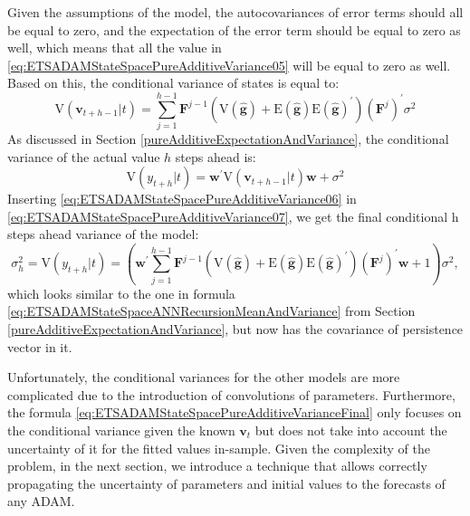 \documentclass[]{book}
\theoremstyle{definition}
\theoremstyle{definition}
\theoremstyle{definition}
\theoremstyle{definition}
\theoremstyle{remark}
\begin{document}
Given the assumptions of the model, the autocovariances of error terms should all be equal to zero, and the expectation of the error term should be equal to zero as well, which means that all the value in \eqref{eq:ETSADAMStateSpacePureAdditiveVariance05} will be equal to zero as well. Based on this, the conditional variance of states is equal to:
\begin{equation}
    \mathrm{V}(\mathbf{v}_{t+h-1}|t) = \sum_{j=1}^{h-1} \mathbf{F}^{j-1} \left( \mathrm{V} (\hat{\mathbf{g}}) + \mathrm{E} (\hat{\mathbf{g}}) \mathrm{E} (\hat{\mathbf{g}})^\prime \right) (\mathbf{F}^{j})^\prime \sigma^2
  \label{eq:ETSADAMStateSpacePureAdditiveVariance06}
\end{equation}
As discussed in Section \ref{pureAdditiveExpectationAndVariance}, the conditional variance of the actual value \(h\) steps ahead is:
\begin{equation}
    \mathrm{V}(y_{t+h}|t) = \mathbf{w}^\prime \mathrm{V}(\mathbf{v}_{t+h-1}|t) \mathbf{w} + \sigma^2
  \label{eq:ETSADAMStateSpacePureAdditiveVariance07}
\end{equation}
Inserting \eqref{eq:ETSADAMStateSpacePureAdditiveVariance06} in \eqref{eq:ETSADAMStateSpacePureAdditiveVariance07}, we get the final conditional h steps ahead variance of the model:
\begin{equation}
    \sigma^2_h = \mathrm{V}(y_{t+h}|t) = \left(\mathbf{w}^\prime \sum_{j=1}^{h-1} \mathbf{F}^{j-1} \left( \mathrm{V} (\hat{\mathbf{g}}) + \mathrm{E} (\hat{\mathbf{g}}) \mathrm{E} (\hat{\mathbf{g}})^\prime \right) (\mathbf{F}^{j})^\prime \mathbf{w} + 1 \right)\sigma^2,
  \label{eq:ETSADAMStateSpacePureAdditiveVarianceFinal}
\end{equation}
which looks similar to the one in formula \eqref{eq:ETSADAMStateSpaceANNRecursionMeanAndVariance} from Section \ref{pureAdditiveExpectationAndVariance}, but now has the covariance of persistence vector in it.

Unfortunately, the conditional variances for the other models are more complicated due to the introduction of convolutions of parameters. Furthermore, the formula \eqref{eq:ETSADAMStateSpacePureAdditiveVarianceFinal} only focuses on the conditional variance given the known \(\mathbf{v}_t\) but does not take into account the uncertainty of it for the fitted values in-sample. Given the complexity of the problem, in the next section, we introduce a technique that allows correctly propagating the uncertainty of parameters and initial values to the forecasts of any ADAM.
\end{document}
